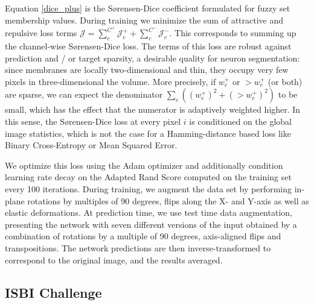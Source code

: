 Equation \ref{dice_plus} is the S{\o}rensen-Dice coefficient \cite{dice1945measures,sorensen1948method} formulated for fuzzy set membership values.
During training we minimize the sum of attractive and repulsive loss terms $\mathcal{J} = \sum_{c}^{C^+} \mathcal{J}^{+}_{c} + \sum_{c}^{C^-} \mathcal{J}^{-}_{c}$. This corresponds to summing up the channel-wise S{\o}rensen-Dice loss. 
The terms of this loss are robust against prediction and / or target sparsity, a desirable quality for neuron segmentation: since membranes are locally two-dimensional and thin, they occupy very few pixels in three-dimensional the volume. 
More precisely, if $w^{+}_e$ or $\gt{w}^{+}_e$ (or both) are sparse, we can expect the denominator $\sum_e(({w^{+}_e})^2 + (\gt{w}^+_e)^2)$ to be small,
which has the effect that the numerator is adaptively weighted higher. 
In this sense, the S{\o}rensen-Dice loss at every pixel $i$ is conditioned on the global image statistics, which is not the case for a Hamming-distance based loss like Binary Cross-Entropy or Mean Squared Error. 

We optimize this loss using the Adam optimizer \cite{kingma2014adam} and additionally condition learning rate decay on 
the Adapted Rand Score \cite{isbi2012challenge} computed on the training set every 100 iterations.
During training, we augment the data set by performing in-plane rotations by multiples of 90 degrees, flips along the X- and Y-axis as well as elastic deformations.
At prediction time, we use test time data augmentation, presenting the network with
seven different versions of the input obtained by a combination of rotations by a multiple of 90 degrees, axis-aligned flips and transpositions.
The network predictions are then inverse-transformed to correspond to the original image, and the results averaged.

\subsection{ISBI Challenge} \label{4_isbi}

